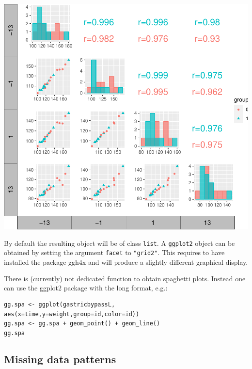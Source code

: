 \documentclass[12pt]{article}
\begin{document}
\begin{minipage}{0.48\linewidth}
\begin{center}
\includegraphics[trim={0 0 0 0},width=\textwidth]{./figures/scatterplot-group.pdf}
\end{center}
\end{minipage}


\bigskip

By default the resulting object will be of class \texttt{list}. A \texttt{ggplot2}
object can be obtained by setting the argument \texttt{facet} to
\texttt{"grid2"}. This requires to have installed the package ggh4x and will
produce a slightly different graphical display.

\bigskip

There is (currently) not dedicated function to obtain spaghetti
plots. Instead one can use the ggplot2 package with the long format, e.g.:
\lstset{language=r,label= ,caption= ,captionpos=b,numbers=none}
\begin{lstlisting}
gg.spa <- ggplot(gastricbypassL, aes(x=time,y=weight,group=id,color=id))
gg.spa <- gg.spa + geom_point() + geom_line()
gg.spa
\end{lstlisting}

\clearpage

\subsection{Missing data patterns}
\label{sec:org693fd4c}
\end{document}
